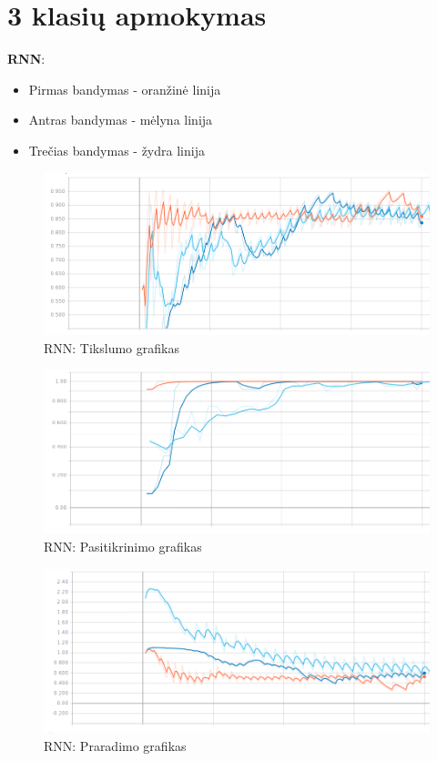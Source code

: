\documentclass{VUMIFPSbakalaurinis}
\begin{document}
\section{3 klasių apmokymas}
\label{appendix:3kl}

\textbf{RNN}:
\begin{itemize}
	\item Pirmas bandymas - oranžinė linija
	\item Antras bandymas - mėlyna linija
	\item Trečias bandymas - žydra linija
\end{itemize}

\begin{figure}[H]
	\centering
	\includegraphics[scale=0.3]{img/1/acc}
	\caption{RNN: Tikslumo grafikas}
	\label{img:3acc}
\end{figure}

\begin{figure}[H]
	\centering
	\includegraphics[scale=0.3]{img/1/val}
	\caption{RNN: Pasitikrinimo grafikas}
	\label{img:3val}
\end{figure}

\begin{figure}[H]
	\centering
	\includegraphics[scale=0.3]{img/1/loss}
	\caption{RNN: Praradimo grafikas}
	\label{img:3loss}
\end{figure}
\end{document}
